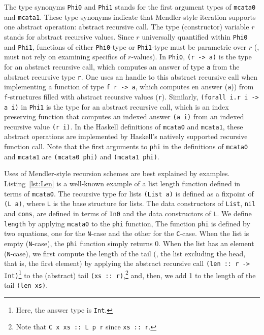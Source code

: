 The type synonyms \lstinline{Phi0} and \lstinline{Phi1} stands for
the first argument types of \lstinline{mcata0} and \lstinline{mcata1}.
These type synonyms indicate that Mendler-style iteration supports
one abstract operation: abstract recursive call.
The type (constructor) variable $r$ stands for abstract recursive values.
Since $r$ universally quantified within \lstinline{Phi0} and \lstinline{Phi1},
functions of either \lstinline{Phi0}-type or \lstinline{Phi1}-type must be
parametric over $r$ (\ie, must not rely on examining specifics of $r$-values).
In \lstinline{Phi0}, \lstinline{(r -> a)} is the type for
an abstract recursive call, which computes an answer of type \lstinline{a}
from the abstract recursive type \lstinline{r}. One uses an handle to
this abstract recursive call when implementing a function of type
\lstinline{f r -> a}, which computes en answer (\lstinline{a})) from
\lstinline{f}-structures filled with abstract recursive values (\lstinline{r}).
Similarly, \lstinline{(forall i.r i -> a i)} in \lstinline{Phi1} is the type
for an abstract recursive call, which is an index preserving function that
computes an indexed answer \lstinline{(a i)} from an indexed recursive value
\lstinline{(r i)}. In the Haskell definitions of \lstinline{mcata0} and
\lstinline{mcata1}, these abstract operations are implemented by Haskell's
natively supported recursive function call. Note that the first arguments to
\lstinline{phi} in the definitions of \lstinline{mcata0} and \lstinline{mcata1}
are \lstinline{(mcata0 phi)} and \lstinline{(mcata1 phi)}.

Uses of Mendler-style recursion schemes are best explained by examples.
Listing~\ref{lst:Len} is a well-known example of a list length function
defined in terms of \lstinline{mcata0}. The recursive type for lists
\lstinline{(List a)} is defined as a fixpoint of \lstinline{(L a)},
where \lstinline{L} is the base structure for lists. The data constructors
of \lstinline{List}, \lstinline{nil} and \lstinline{cons}, are defined
in terms of \lstinline{In0} and the data constructors of \lstinline{L}.
We define \lstinline{length} by applying \lstinline{mcata0} to
the \lstinline{phi} function, The function \lstinline{phi} is defined
by two equations, one for the \lstinline{N}-case and the other for
the \lstinline{C}-case. When the list is empty (\lstinline{N}-case),
the \lstinline{phi} function simply returns 0. When the list has an
element (\lstinline{N}-case), we first compute the length of the tail
(\ie, the list excluding the head, that is, the first element) by
applying the abstract recursive call \lstinline{(len :: r -> Int)}\footnote{
	Here, the answer type is \lstinline{Int}. }
to the (abstract) tail \lstinline{(xs :: r)},\footnote{
	Note that \lstinline{C x xs :: L p r} since \lstinline{xs :: r}.}
and, then, we add 1 to the length of the tail \lstinline{(len xs)}.

